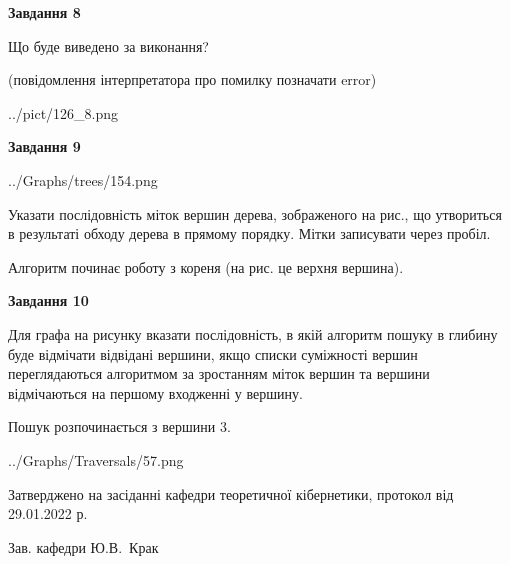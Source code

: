 \documentclass[12pt, ukrainian]{article}
\begin{document}
{\begin {large}
{\begin {center}\textbf{Завдання 8}\end {center}}\par
Що буде виведено за виконання?\par
 (повідомлення інтерпретатора про помилку позначати error)\par
\begin{center}
	{../pict/126_8.png}
\end{center}
\newpage

{\begin {center}\textbf{Завдання 9}\end {center}}\par

\begin{center}
	{../Graphs/trees/154.png}
\end{center}
Указати послідовність міток вершин дерева, зображеного на рис., що утвориться в результаті обходу дерева в прямому порядку. Мітки записувати через пробіл.\par Алгоритм починає роботу з кореня (на рис. це верхня вершина).\par
\newpage

{\begin {center}\textbf{Завдання 10}\end {center}}\par
Для графа на рисунку вказати послідовність, в якій алгоритм пошуку в глибину буде відмічати відвідані вершини, якщо списки суміжності вершин переглядаються алгоритмом за зростанням міток вершин та вершини відмічаються на першому вход\-женні у вершину.\par
Пошук розпочинається з вершини 3.\par

\begin{center}
	{../Graphs/Traversals/57.png}
\end{center}\par
\newpage


\end {large}
}
{\smallskip \begin {small} Затверджено на засіданні кафедри теоретичної кібернетики, протокол  від   29.01.2022 р.\par\smallskip\smallskip
{\parbox {6.5 cm}{Зав. кафедри \dotfill Ю.В.~Крак}} \end{small}}
\end{document}

